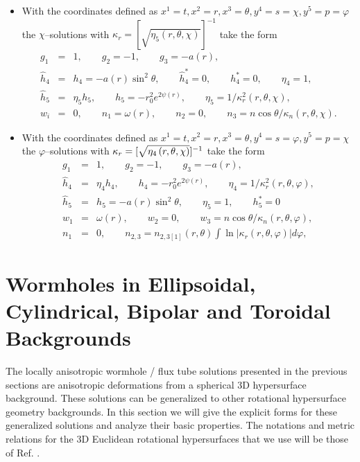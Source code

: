 \documentclass[a4paper,preprint,prabib,aps]{revtex4}
\begin{document}
\begin{itemize}
\item  With the coordinates defined as $x^1 =t , x^2=r , x^3=\theta , y^4
=s=\chi , y^5=p=\varphi$ the $\chi $--solutions with $\kappa _r=[\sqrt{\eta
_5\left( r,\theta ,\chi \right) }]^{-1}$ take the form
\begin{eqnarray}
g_1 &=&1 , \qquad g_2=-1 , \qquad g_3=-a(r),  \nonumber \\
\widehat{h}_4 &=&h_4=-a(r)\sin ^2\theta , \qquad \widehat{h}_4^{*}=0 ,
\qquad h_4^{*}=0 , \qquad \eta_4=1,  \label{set5a} \\
\widehat{h}_5 &=&\eta _5h_5 , \qquad h_5=-r_0^2e^{2\psi (r)} , \qquad \eta
_5=1/\kappa_r^2(r,\theta ,\chi ),  \nonumber \\
w_i &=&0 , \qquad n_1=\omega (r) , \qquad n_2=0 , \qquad n_3=n\cos \theta
/\kappa _n(r,\theta ,\chi).  \nonumber
\end{eqnarray}

\item  With the coordinates defined as $x^1 =t , x^2=r , x^3=\theta , y^4
=s=\varphi , y^5=p=\chi$ the $\varphi $--solutions with $\kappa _r=[\sqrt{%
\eta _4\left( r,\theta ,\chi \right) }]^{-1}$ take the form
\begin{eqnarray}
g_1 &=&1 , \qquad g_2=-1 , \qquad g_3=-a(r),  \nonumber \\
\widehat{h}_4 &=&\eta _4h_4 , \qquad h_4=-r_0^2e^{2\psi (r)} , \qquad\eta
_4=1/\kappa_r^2(r,\theta ,\varphi ),  \label{set5b} \\
\widehat{h}_5 &=&h_5=-a(r)\sin ^2\theta , \qquad \eta _5=1 , \qquad h_5^{*}=0
\nonumber \\
w_1 &=&\omega (r) , \qquad w_2=0 , \qquad w_3=n\cos \theta /\kappa _n \left(
r,\theta,\varphi \right) ,  \nonumber \\
n_1 &=&0 , \qquad n_{2,3}=n_{2,3[1]}(r,\theta )\int \ln | \kappa
_r(r,\theta,\varphi )|d\varphi ,  \nonumber
\end{eqnarray}
\end{itemize}

\section{Wormholes in Ellipsoidal, Cylindrical, Bipolar and Toroidal
Backgrounds}

The locally anisotropic wormhole / flux tube solutions presented in the
previous sections are anisotropic deformations from a spherical 3D
hypersurface background. These solutions can be generalized to other
rotational hypersurface geometry backgrounds. In this section we will give
the explicit forms for these generalized solutions and analyze their basic
properties. The notations and metric relations for the 3D Euclidean
rotational hypersurfaces that we use will be those of Ref. \cite{korn}.
\end{document}
